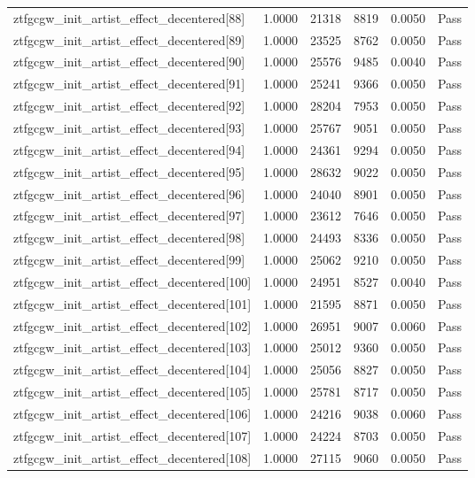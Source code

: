 \begin{table}[htbp]
\begin{tabular}{llrrll}
ztfgcgw\_init\_artist\_effect\_decentered[88] & 1.0000 & 21318 & 8819 & 0.0050 & Pass \\
ztfgcgw\_init\_artist\_effect\_decentered[89] & 1.0000 & 23525 & 8762 & 0.0050 & Pass \\
ztfgcgw\_init\_artist\_effect\_decentered[90] & 1.0000 & 25576 & 9485 & 0.0040 & Pass \\
ztfgcgw\_init\_artist\_effect\_decentered[91] & 1.0000 & 25241 & 9366 & 0.0050 & Pass \\
ztfgcgw\_init\_artist\_effect\_decentered[92] & 1.0000 & 28204 & 7953 & 0.0050 & Pass \\
ztfgcgw\_init\_artist\_effect\_decentered[93] & 1.0000 & 25767 & 9051 & 0.0050 & Pass \\
ztfgcgw\_init\_artist\_effect\_decentered[94] & 1.0000 & 24361 & 9294 & 0.0050 & Pass \\
ztfgcgw\_init\_artist\_effect\_decentered[95] & 1.0000 & 28632 & 9022 & 0.0050 & Pass \\
ztfgcgw\_init\_artist\_effect\_decentered[96] & 1.0000 & 24040 & 8901 & 0.0050 & Pass \\
ztfgcgw\_init\_artist\_effect\_decentered[97] & 1.0000 & 23612 & 7646 & 0.0050 & Pass \\
ztfgcgw\_init\_artist\_effect\_decentered[98] & 1.0000 & 24493 & 8336 & 0.0050 & Pass \\
ztfgcgw\_init\_artist\_effect\_decentered[99] & 1.0000 & 25062 & 9210 & 0.0050 & Pass \\
ztfgcgw\_init\_artist\_effect\_decentered[100] & 1.0000 & 24951 & 8527 & 0.0040 & Pass \\
ztfgcgw\_init\_artist\_effect\_decentered[101] & 1.0000 & 21595 & 8871 & 0.0050 & Pass \\
ztfgcgw\_init\_artist\_effect\_decentered[102] & 1.0000 & 26951 & 9007 & 0.0060 & Pass \\
ztfgcgw\_init\_artist\_effect\_decentered[103] & 1.0000 & 25012 & 9360 & 0.0050 & Pass \\
ztfgcgw\_init\_artist\_effect\_decentered[104] & 1.0000 & 25056 & 8827 & 0.0050 & Pass \\
ztfgcgw\_init\_artist\_effect\_decentered[105] & 1.0000 & 25781 & 8717 & 0.0050 & Pass \\
ztfgcgw\_init\_artist\_effect\_decentered[106] & 1.0000 & 24216 & 9038 & 0.0060 & Pass \\
ztfgcgw\_init\_artist\_effect\_decentered[107] & 1.0000 & 24224 & 8703 & 0.0050 & Pass \\
ztfgcgw\_init\_artist\_effect\_decentered[108] & 1.0000 & 27115 & 9060 & 0.0050 & Pass \\

\end{tabular}
\end{table}
